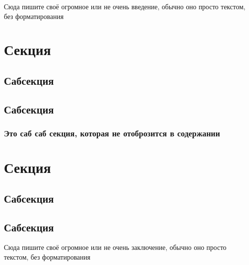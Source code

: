 


	\tableofcontents
	\newpage
	
	Сюда пишите своё огромное или не очень введение, обычно оно просто текстом, без форматирования
	\newpage
	
	\section{Секция}
	\subsection{Сабсекция}
	\subsection{Сабсекция}
	\subsubsection{Это саб саб секция, которая не отоброзится в содержании}
	\newpage
	
	\section{Секция}
	\subsection{Сабсекция}
	\subsection{Сабсекция}
	\newpage
	
	Сюда пишите своё огромное или не очень заключение, обычно оно просто текстом, без форматирования
